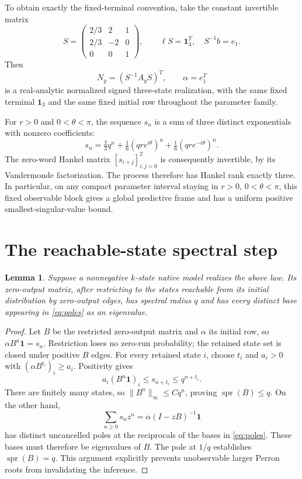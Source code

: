 \documentclass[11pt]{article}
\newtheorem{lemma}[theorem]{Lemma}
\newcommand{\one}{\mathbf 1}
\newcommand{\rhoo}{\operatorname{spr}}
\begin{document}
To obtain exactly the fixed-terminal convention, take the constant invertible matrix
\[
 S=\begin{pmatrix}2/3&2&1\\2/3&-2&0\\0&0&1\end{pmatrix},
 \qquad \ell S=\one_3^T,\quad S^{-1}b=e_1.
\]
Then
\[
 N_y=(S^{-1}A_yS)^T,\qquad \alpha=e_1^T
\]
is a real-analytic normalized signed three-state realization, with the same fixed terminal $\one_3$ and the same fixed initial row throughout the parameter family.

For $r>0$ and $0<\theta<\pi$, the sequence $s_n$ is a sum of three distinct exponentials with nonzero coefficients:
\begin{equation}\label{eq:poles}
 s_n=\tfrac23q^n+\tfrac16(qre^{i\theta})^n+\tfrac16(qre^{-i\theta})^n.
\end{equation}
The zero-word Hankel matrix $[s_{i+j}]_{i,j=0}^2$ is consequently invertible, by its Vandermonde factorization. The process therefore has Hankel rank exactly three. In particular, on any compact parameter interval staying in $r>0$, $0<\theta<\pi$, this fixed observable block gives a global predictive frame and has a uniform positive smallest-singular-value bound.

\section{The reachable-state spectral step}
\begin{lemma}\label{lem:spectral}
Suppose a nonnegative $k$-state native model realizes the above law. Its zero-output matrix, after restricting to the states reachable from its initial distribution by zero-output edges, has spectral radius $q$ and has every distinct base appearing in \eqref{eq:poles} as an eigenvalue.
\end{lemma}
\begin{proof}
Let $B$ be the restricted zero-output matrix and $\alpha$ its initial row, so $\alpha B^n\one=s_n$. Restriction loses no zero-run probability; the retained state set is closed under positive $B$ edges. For every retained state $i$, choose $t_i$ and $a_i>0$ with $(\alpha B^{t_i})_i\geq a_i$. Positivity gives
\[
 a_i(B^n\one)_i\leq s_{n+t_i}\leq q^{n+t_i}.
\]
There are finitely many states, so $\|B^n\|_\infty\leq Cq^n$, proving $\rhoo(B)\leq q$. On the other hand,
\[
 \sum_{n\geq0}s_nz^n=\alpha(I-zB)^{-1}\one
\]
has distinct uncancelled poles at the reciprocals of the bases in \eqref{eq:poles}. These bases must therefore be eigenvalues of $B$. The pole at $1/q$ establishes $\rhoo(B)=q$. This argument explicitly prevents unobservable larger Perron roots from invalidating the inference.
\end{proof}
\end{document}

